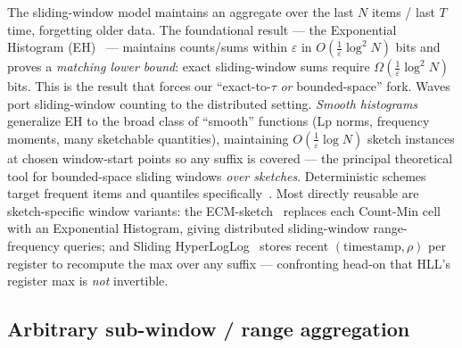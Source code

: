 The sliding-window model maintains an aggregate over the last $N$ items /
last $T$ time, forgetting older data. The foundational result --- the
Exponential Histogram (EH)~\cite{datar2002sliding} --- maintains
counts/sums within $\varepsilon$ in $O(\tfrac{1}{\varepsilon}\log^2 N)$
bits and proves a \emph{matching lower bound}: exact sliding-window sums
require $\Omega(\tfrac{1}{\varepsilon}\log^2 N)$ bits. This is the result
that forces our ``exact-to-$\tau$ \emph{or} bounded-space'' fork. Waves
\cite{gibbons2002distributed} port sliding-window counting to the
distributed setting. \emph{Smooth histograms}~\cite{braverman2007smooth}
generalize EH to the broad class of ``smooth'' functions (Lp norms,
frequency moments, many sketchable quantities), maintaining
$O(\tfrac{1}{\varepsilon}\log N)$ sketch instances at chosen window-start
points so any suffix is covered --- the principal theoretical tool for
bounded-space sliding windows \emph{over sketches}. Deterministic schemes
target frequent items and quantiles
specifically~\cite{arasu2004quantiles,lee2006significant}. Most directly
reusable are sketch-specific window variants: the
ECM-sketch~\cite{papapetrou2012ecm} replaces each Count-Min cell with an
Exponential Histogram, giving distributed sliding-window range-frequency
queries; and Sliding HyperLogLog~\cite{chabchoub2010sliding} stores recent
$(\text{timestamp},\rho)$ per register to recompute the max over any
suffix --- confronting head-on that HLL's register max is \emph{not}
invertible.

\subsection{Arbitrary sub-window / range aggregation}

